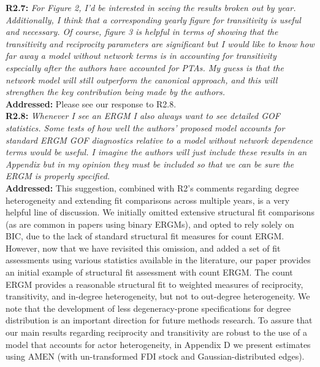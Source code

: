 \documentclass[a4paper,11pt]{texMemo}
\begin{document}
\noindent \textbf{R2.7:} \emph{For Figure 2, I'd be interested in seeing the results broken out by year. Additionally, I think that a corresponding yearly figure for transitivity is useful and necessary. Of course, figure 3 is helpful in terms of showing that the transitivity and reciprocity parameters are significant but I would like to know how far away a model without network terms is in accounting for transitivity especially after the authors have accounted for PTAs. My guess is that the network model will still outperform the canonical approach, and this will strengthen the key contribution being made by the authors.}\\

\noindent \textbf{Addressed:} Please see our response to R2.8.  \\

\noindent \textbf{R2.8:} \emph{Whenever I see an ERGM I also always want to see detailed GOF statistics. Some tests of how well the authors' proposed model accounts for standard ERGM GOF diagnostics relative to a model without network dependence terms would be useful. I imagine the authors will just include these results in an Appendix but in my opinion they must be included so that we can be sure the ERGM is properly specified.}\\

\noindent \textbf{Addressed:}  This suggestion, combined with R2's comments regarding degree heterogeneity and extending fit comparisons across multiple years, is a very helpful line of discussion. We initially omitted extensive structural fit comparisons (as are common in papers using binary ERGMs), and opted to rely solely on BIC, due to the lack of standard structural fit measures for count ERGM. However, now that we have revisited this omission, and added a set of fit assessments using various statistics available in the literature, our paper provides an initial example of structural fit assessment with count ERGM.  The count ERGM provides a reasonable structural fit to weighted measures of reciprocity, transitivity, and in-degree heterogeneity, but not to out-degree heterogeneity. We note that the development of less degeneracy-prone specifications for degree distribution is an important direction for future methods research. To assure that our main results regarding reciprocity and transitivity are robust to the use of a model that accounts for actor heterogeneity, in Appendix D we present estimates using AMEN (with un-transformed FDI stock and Gaussian-distributed edges). \\
\\
\end{document}
